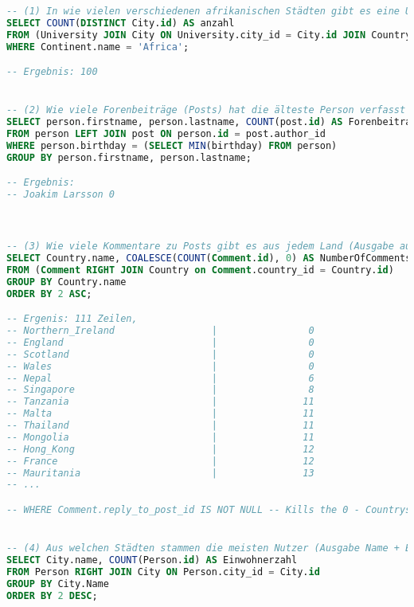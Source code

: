 \begin{lstlisting}[language=sql]
-- (1) In wie vielen verschiedenen afrikanischen Städten gibt es eine Universität?
SELECT COUNT(DISTINCT City.id) AS anzahl
FROM (University JOIN City ON University.city_id = City.id JOIN Country ON City.country_id = Country.id JOIN Continent ON Country.continent_id = Continent.id)
WHERE Continent.name = 'Africa';

-- Ergebnis: 100


-- (2) Wie viele Forenbeiträge (Posts) hat die älteste Person verfasst (Ausgabe: Name, #Forenbeiträge)?
SELECT person.firstname, person.lastname, COUNT(post.id) AS Forenbeitraege
FROM person LEFT JOIN post ON person.id = post.author_id
WHERE person.birthday = (SELECT MIN(birthday) FROM person)
GROUP BY person.firstname, person.lastname;

-- Ergebnis:
-- Joakim Larsson 0



-- (3) Wie viele Kommentare zu Posts gibt es aus jedem Land (Ausgabe aufsteigend sortiert nach Kommentaranzahl)? Die Liste soll auch Länder enthalten, für die keine Post-Kommentare existieren, d.h. die Kommentaranzahl = 0 ist! (Funktion Coalesce)
SELECT Country.name, COALESCE(COUNT(Comment.id), 0) AS NumberOfComments
FROM (Comment RIGHT JOIN Country on Comment.country_id = Country.id)
GROUP BY Country.name
ORDER BY 2 ASC;

-- Ergenis: 111 Zeilen,
-- Northern_Ireland                 |                0
-- England                          |                0
-- Scotland                         |                0
-- Wales                            |                0
-- Nepal                            |                6
-- Singapore                        |                8
-- Tanzania                         |               11
-- Malta                            |               11
-- Thailand                         |               11
-- Mongolia                         |               11
-- Hong_Kong                        |               12
-- France                           |               12
-- Mauritania                       |               13
-- ...

-- WHERE Comment.reply_to_post_id IS NOT NULL -- Kills the 0 - Countrys


-- (4) Aus welchen Städten stammen die meisten Nutzer (Ausgabe Name + Einwohnerzahl)?
SELECT City.name, COUNT(Person.id) AS Einwohnerzahl
FROM Person RIGHT JOIN City ON Person.city_id = City.id
GROUP BY City.Name
ORDER BY 2 DESC;


\end{lstlisting}
